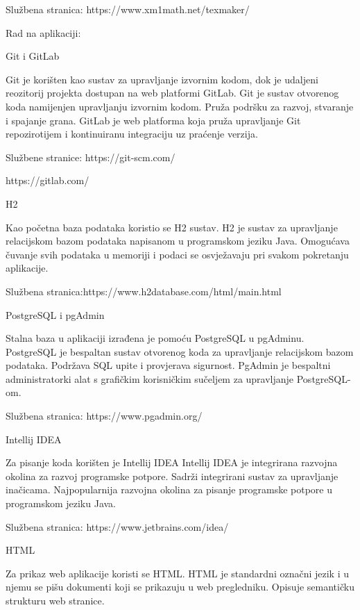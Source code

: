 Službena stranica: https://www.xm1math.net/texmaker/
\vspace{8mm}

Rad na aplikaciji:
\vspace{4mm}

Git i GitLab

Git je korišten kao sustav za upravljanje izvornim kodom, dok je udaljeni reozitorij projekta dostupan na web platformi GitLab.
Git je sustav otvorenog koda namijenjen upravljanju izvornim kodom. Pruža podršku za razvoj, stvaranje i spajanje grana.
GitLab je web platforma koja pruža upravljanje Git repozirotijem i kontinuiranu integraciju uz praćenje verzija. 

Službene stranice: https://git-scm.com/

	https://gitlab.com/
\vspace{3mm}

H2

Kao početna baza podataka koristio se H2 sustav.
H2 je sustav za upravljanje relacijskom bazom podataka napisanom u programskom jeziku Java. Omogućava čuvanje svih podataka u memoriji i podaci se osvježavaju pri svakom pokretanju aplikacije.

Službena stranica:https://www.h2database.com/html/main.html 
\vspace{3mm}

PostgreSQL i pgAdmin

Stalna baza u aplikaciji izrađena je pomoću PostgreSQL u pgAdminu.
PostgreSQL je bespaltan sustav otvorenog koda za upravljanje relacijskom bazom podataka. Podržava SQL upite i provjerava sigurnost.
PgAdmin je bespaltni administratorki alat s grafičkim korisničkim sučeljem za upravljanje PostgreSQL-om.

Službena stranica: https://www.pgadmin.org/
\vspace{3mm}

Intellij IDEA

Za pisanje koda korišten je Intellij IDEA
Intellij IDEA je integrirana razvojna okolina za razvoj programske potpore. Sadrži integrirani sustav za upravljanje inačicama. Najpopularnija razvojna okolina za pisanje programske potpore u programskom jeziku Java.

Službena stranica: https://www.jetbrains.com/idea/
\vspace{3mm}


HTML

Za prikaz web aplikacije koristi se HTML. 
HTML je standardni označni jezik i u njemu se pišu dokumenti koji se prikazuju u web pregledniku. Opisuje semantičku strukturu web stranice.
\vspace{3mm}

